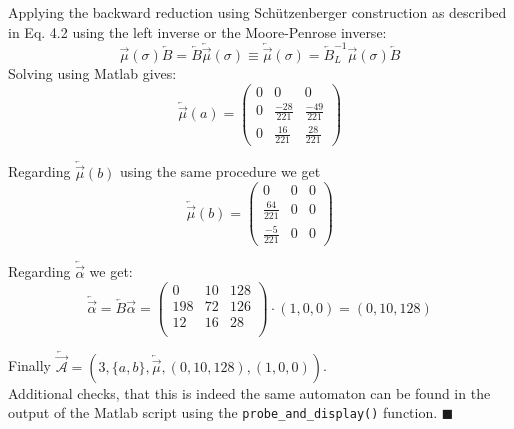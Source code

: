         Applying the backward reduction using Schützenberger construction as described in \autocite{Kiefer2013OnTC} Eq. 4.2 using the left inverse or the Moore-Penrose inverse:
        \[ \overrightarrow{\mu}(\sigma) \overleftarrow{B} = \overleftarrow{B}\overleftarrow{\overrightarrow{\mu}}(\sigma) \equiv \overleftarrow{\overrightarrow{\mu}}(\sigma) = \overleftarrow{B}^{-1}_L  \overrightarrow{\mu}(\sigma) \overleftarrow{B} \]
        Solving using Matlab gives:
        \[
        \overleftarrow{\overrightarrow{\mu}}(a) = 
        \begin{pmatrix}
            0 & 0 & 0 \\
            0 & \frac{-28}{221} & \frac{-49}{221} \\
            0 & \frac{16}{221} & \frac{28}{221}
        \end{pmatrix}
       \]
        
            
        Regarding $\overleftarrow{\overrightarrow{\mu}}(b)$ using the same procedure we get
        \[ \overleftarrow{\overrightarrow{\mu}}(b) = 
            \begin{pmatrix}
                0 & 0 & 0 \\
                \frac{64}{221} & 0 & 0 \\
                \frac{-5}{221} & 0 & 0
            \end{pmatrix}
        \] 
        
        Regarding $\overleftarrow{\overrightarrow{\alpha}}$ we get:
        \[ \overleftarrow{\overrightarrow{\alpha}} = \overleftarrow{B} \overrightarrow{\alpha} =  \begin{pmatrix}
            0 & 10 & 128 \\
            198 & 72 & 126 \\
            12 & 16 & 28  \\
        \end{pmatrix} \cdot (1,0,0) = (0, 10, 128) \]
            
            
        Finally $\overleftarrow{\overrightarrow{\mathcal{A}}} = (3, \{a, b\}, \overleftarrow{\overrightarrow{\mu}}, (0, 10, 128), (1,0,0))$. \\

        Additional checks, that this is indeed the same automaton can be found in the output of the Matlab script using the \texttt{probe_and_display()} function. \hfill $\blacksquare$
        \newpage
        
            
        
